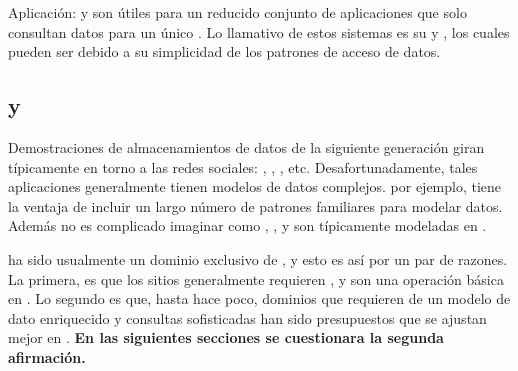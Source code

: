Aplicación: \keyDB {} \stores y \wideColumnDB \stores son útiles para un reducido conjunto de aplicaciones que solo consultan datos para un único \keyValue. Lo llamativo de estos sistemas es su \performanceQA y \scalabilityQA, los cuales pueden ser \highly \optimized debido a su simplicidad de los patrones de acceso de datos.









\subsection{\mongodbNAME y \ecommerce \cite{online_mongodb_ecommerce}}
\label{cap:justificacion_proyecto:MongoDB_ECommerce}

Demostraciones de almacenamientos de datos de la siguiente generación giran típicamente en torno a las redes sociales: \twitterNAME, \facebook, \foursquare, etc. Desafortunadamente, tales aplicaciones generalmente tienen modelos de datos complejos. \ecommerce por ejemplo, tiene la ventaja de incluir un largo número de patrones familiares para modelar datos. Además no es complicado imaginar como \itemCOM, \categoriesCommerce, \itemReviewsCommerce y \ordersCommerce son típicamente modeladas en \rdbms.

\ecommerce ha sido usualmente un dominio exclusivo de \rdbms, y esto es así por un par de razones. La primera, es que los sitios \ecommerce generalmente requieren \transactionsDB, y \transactionsDB son una operación básica en \rdbms. Lo segundo es que, hasta hace poco, dominios que requieren de un modelo de dato enriquecido y consultas sofisticadas han sido presupuestos que se ajustan mejor en \rdbms. \textbf{En las siguientes secciones se cuestionara la segunda afirmación.}

